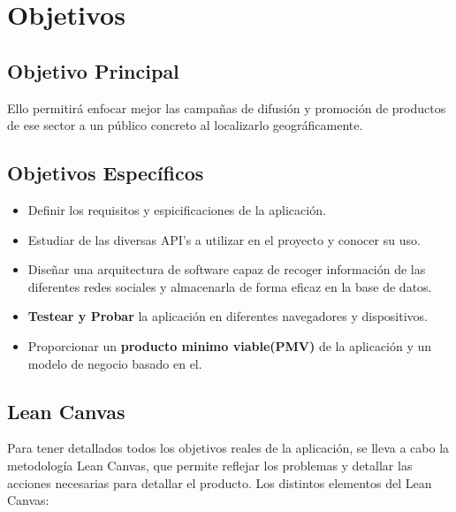 \chapter{Objetivos}


\section{Objetivo Principal}


Ello permitirá enfocar mejor las campañas de difusión y promoción de productos de ese sector a un público concreto al localizarlo geográficamente.

\vspace{5 mm}

\section{Objetivos Específicos}

\begin{itemize}
  \item Definir los requisitos y espicificaciones de la aplicación.
  \item Estudiar de las diversas API's a utilizar en el proyecto y conocer su uso.
  \item Diseñar una arquitectura de software capaz de recoger información de las diferentes redes sociales y almacenarla de forma eficaz en la base de datos.
  \item \textbf{Testear y Probar} la aplicación en diferentes navegadores y dispositivos.
  \item Proporcionar un \textbf{producto minimo viable(PMV)} de la aplicación y un modelo de negocio basado en el.
\end{itemize}

\section{Lean Canvas}

Para tener detallados todos los objetivos reales de la aplicación, se lleva a cabo la metodología Lean Canvas, que permite reflejar los problemas y detallar las acciones necesarias para detallar el producto. Los distintos elementos del Lean Canvas:

